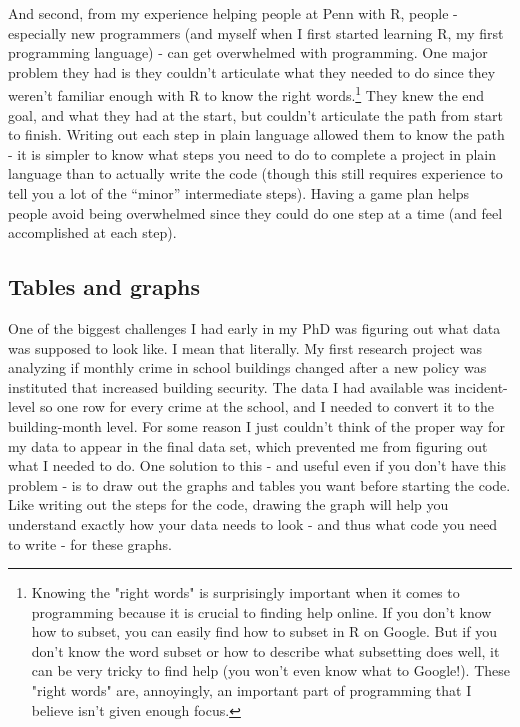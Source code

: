 \documentclass[
  a4paper,
]{krantz}
\begin{document}
And second, from my experience helping people at Penn with
R, people - especially new programmers (and myself when I
first started learning R, my first programming language) -
can get overwhelmed with programming. One major problem they
had is they couldn't articulate what they needed to do since
they weren't familiar enough with R to know the right
words.\footnote{Knowing the "right words" is surprisingly important when it comes to programming because it is crucial to finding help online. If you don't know how to subset, you can easily find how to subset in R on Google. But if you don't know the word subset or how to describe what subsetting does well, it can be very tricky to find help (you won't even know what to Google!). These "right words" are, annoyingly, an important part of programming that I believe isn't given enough focus.}
They knew the end goal, and what they had at the start, but
couldn't articulate the path from start to finish. Writing
out each step in plain language allowed them to know the
path - it is simpler to know what steps you need to do to
complete a project in plain language than to actually write
the code (though this still requires experience to tell you
a lot of the ``minor'' intermediate steps). Having a game
plan helps people avoid being overwhelmed since they could
do one step at a time (and feel accomplished at each step).

\hypertarget{tables-and-graphs}{%
\subsection{Tables and graphs}\label{tables-and-graphs}}

One of the biggest challenges I had early in my PhD was
figuring out what data was supposed to look like. I mean
that literally. My first research project was analyzing if
monthly crime in school buildings changed after a new policy
was instituted that increased building security. The data I
had available was incident-level so one row for every crime
at the school, and I needed to convert it to the
building-month level. For some reason I just couldn't think
of the proper way for my data to appear in the final data
set, which prevented me from figuring out what I needed to
do. One solution to this - and useful even if you don't have
this problem - is to draw out the graphs and tables you want
before starting the code. Like writing out the steps for the
code, drawing the graph will help you understand exactly how
your data needs to look - and thus what code you need to
write - for these graphs.
\end{document}
